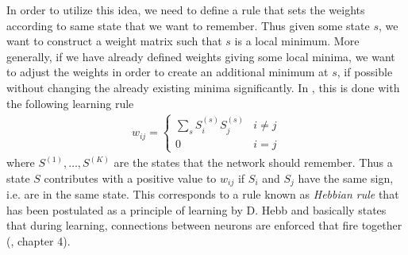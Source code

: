 \documentclass[a4paper, draft]{article}
\theoremstyle{own}
\theoremstyle{remark}
\begin{document}
In order to utilize this idea, we need to define a rule that sets the weights according to same state that we want to remember. Thus given some state $s$, we want to construct a weight matrix such that $s$ is a local minimum. More generally, if we have already defined weights giving some local minima, we want to adjust the weights in order to create an additional minimum at $s$, if possible without changing the already existing minima significantly. In \cite{Hopfield1982}, this is done with the following learning rule
\begin{align}\label{eq:hebbrule}
w_{ij} = 
\begin{cases}
\sum_s S^{(s)}_i S^{(s)}_j & i \neq j \\
0 & i = j
\end{cases}
\end{align}
where $S^{(1)}, \dots, S^{(K)}$ are the states that the network should remember. Thus a state $S$ contributes with a positive value to $w_{ij}$ if $S_i$ and $S_j$ have the same sign, i.e. are in the same state. This corresponds to a rule known as {\em Hebbian rule} that has been postulated as a principle of learning by D. Hebb and basically states that during learning, connections between neurons are enforced that fire together (\cite{Hebb}, chapter 4).
\end{document}
